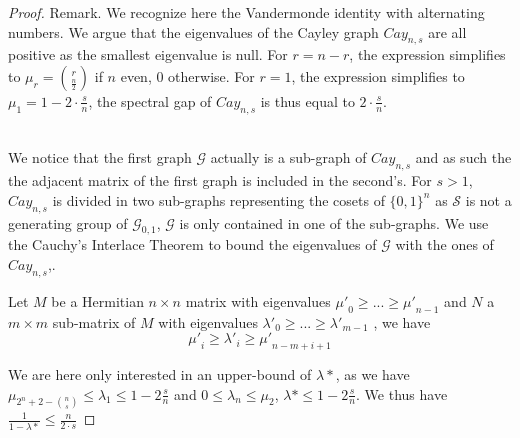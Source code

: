 \documentclass{llncs}
\begin{document}
\begin{proof}
Remark. We recognize here the Vandermonde identity with alternating numbers. We argue that the eigenvalues of the Cayley graph $Cay_{n,s}$ are all positive as the smallest eigenvalue is null.
For $r=n-r$, the expression simplifies to $\mu_r = {r \choose \frac{n}{2}}$ if $n$ even, 0 otherwise.
For $r=1$, the expression simplifies to $\mu_1 = 1 - 2\cdot \frac{s}{n}$, the spectral gap of $Cay_{n,s}$ is thus equal to $2\cdot \frac{s}{n}$.\\\

We notice that the first graph $\mathcal{G}$ actually is a sub-graph of $Cay_{n,s}$ and as such the the adjacent matrix of the first graph is included in the second's.
For $s>1$, $Cay_{n,s}$ is divided in two sub-graphs representing the cosets of $\{0,1\}^n$ as $\mathcal{S}$ is not a generating group of $\mathcal{G}_{0,1}$, $\mathcal{G}$ is only contained in one of the sub-graphs.
We use the Cauchy's Interlace Theorem to bound the eigenvalues of $\mathcal{G}$ with the ones of $Cay_{n,s}$,.

\begin{theorem}
Let $M$ be a Hermitian $n \times n$ matrix with eigenvalues ${\mu'}_0\geq ... \geq {\mu'}_{n-1}$ and $N$ a $m \times m$ sub-matrix of $M$ with eigenvalues ${\lambda'}_0\geq ... \geq {\lambda'}_{m-1}$ , we have
$$ {\mu'}_i \geq {\lambda'}_i \geq {\mu'}_{n-m+i+1} $$
\end{theorem}

We are here only interested in an upper-bound of $\lambda*$, as we have $\mu_{2^n+2-{n \choose s}}\leq \lambda_1\leq 1-2\frac{s}{n}$ and $0 \leq \lambda_n \leq \mu_2$, $\lambda* \leq 1-2\frac{s}{n}$. We thus have $\frac{1}{1-\lambda*}\leq\frac{n}{2\cdot s}$
\end{proof}
\end{document}
